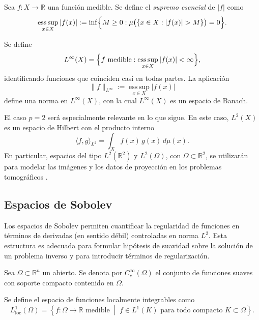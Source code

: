 \begin{definition}
Sea $f : X \to \mathbb{R}$ una función medible. Se define el \emph{supremo esencial}
de $|f|$ como
\[
\operatorname*{ess\,sup}_{x\in X} |f(x)|
:= \inf\Bigl\{ M \ge 0 : \mu\bigl(\{x \in X : |f(x)| > M\}\bigr) = 0 \Bigr\}.
\]
\end{definition}

\begin{definition}
Se define
\[
L^{\infty}(X) 
= \Bigl\{ f \text{ medible} : \operatorname*{ess\,sup}_{x\in X} |f(x)| < \infty \Bigr\},
\]
identificando funciones que coinciden casi en todas partes. La aplicación
\[
\|f\|_{L^{\infty}} := \operatorname*{ess\,sup}_{x\in X} |f(x)|
\]
define una norma en $L^{\infty}(X)$, con la cual $L^{\infty}(X)$ es un espacio de Banach.
\end{definition}

El caso $p=2$ será especialmente relevante en lo que sigue. En este caso, $L^{2}(X)$ es un espacio de Hilbert con el producto interno
\[
\langle f,g \rangle_{L^{2}} = \int_{X} f(x)\,g(x)\, d\mu(x).
\]
En particular, espacios del tipo $L^{2}(\mathbb{R}^{2})$ y $L^{2}(\Omega)$, con $\Omega \subset \mathbb{R}^{2}$, se utilizarán para modelar las imágenes y los datos de proyección en los problemas tomográficos \cite{natterer2001,kuchment2014}.


\subsection{Espacios de Sobolev}

Los espacios de Sobolev permiten cuantificar la regularidad de funciones en términos de derivadas (en sentido débil) controladas en norma $L^{2}$. Esta estructura es adecuada para formular hipótesis de suavidad sobre la solución de un problema inverso y para introducir términos de regularización.

Sea $\Omega \subset \mathbb{R}^{n}$ un abierto. Se denota por $C_{c}^{\infty}(\Omega)$ el conjunto de funciones suaves con soporte compacto contenido en $\Omega$.

\begin{definition}
Se define el espacio de funciones localmente integrables como
\[
L^{1}_{\mathrm{loc}}(\Omega)
= \left\{ f : \Omega \to \mathbb{R} \text{ medible} \;\middle|\;
f \in L^{1}(K) \text{ para todo compacto } K \subset \Omega \right\}.
\]
\end{definition}


